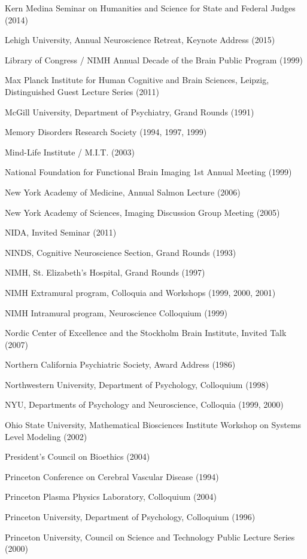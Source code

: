\documentclass[10 pt]{article}
\begin{document}
Kern Medina Seminar on Humanities and Science for State and Federal Judges (2014)

Lehigh University, Annual Neuroscience Retreat, Keynote Address (2015)

Library of Congress / NIMH Annual Decade of the Brain Public Program (1999)

Max Planck Institute for Human Cognitive and Brain Sciences, Leipzig, Distinguished Guest Lecture Series (2011)

McGill University, Department of Psychiatry, Grand Rounds (1991)

Memory Disorders Research Society (1994, 1997, 1999)

Mind-Life Institute / M.I.T. (2003)

National Foundation for Functional Brain Imaging 1st Annual Meeting (1999)

New York Academy of Medicine, Annual Salmon Lecture (2006)

New York Academy of Sciences, Imaging Discussion Group Meeting (2005)

NIDA, Invited Seminar (2011)

NINDS, Cognitive Neuroscience Section, Grand Rounds (1993)

NIMH, St. Elizabeth's Hospital, Grand Rounds (1997)

NIMH Extramural program, Colloquia and Workshops (1999, 2000, 2001)

NIMH Intramural program, Neuroscience Colloquium (1999)

Nordic Center of Excellence and the Stockholm Brain Institute, Invited Talk (2007)

Northern California Psychiatric Society, Award Address (1986)

Northwestern University, Department of Psychology, Colloquium (1998)

NYU, Departments of Psychology and Neuroscience, Colloquia (1999, 2000)

Ohio State University, Mathematical Biosciences Institute Workshop on Systems Level Modeling (2002)

President’s Council on Bioethics (2004)

Princeton Conference on Cerebral Vascular Disease (1994)

Princeton Plasma Physics Laboratory, Colloquium (2004)

Princeton University, Department of Psychology, Colloquium (1996)

Princeton University, Council on Science and Technology Public Lecture Series (2000)
\end{document}
